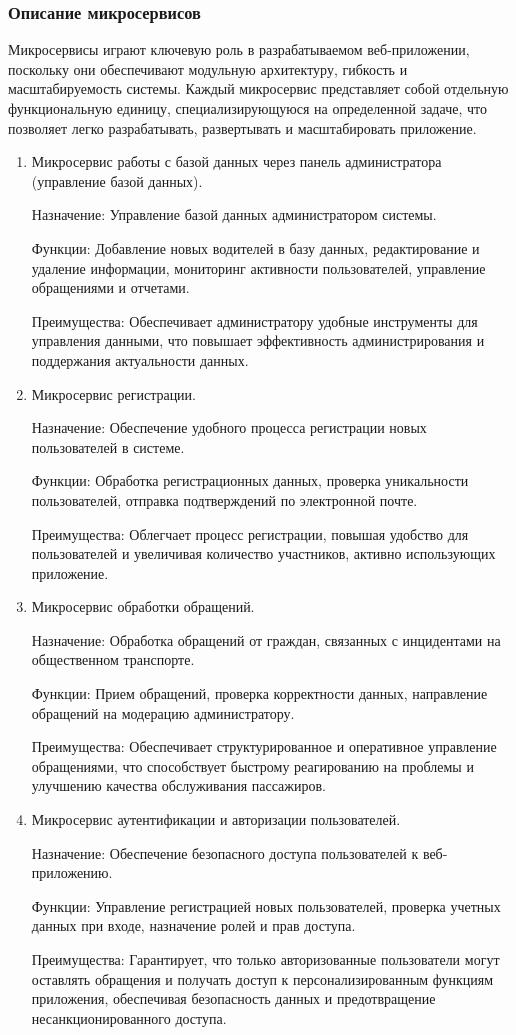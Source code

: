 \subsubsection{Описание микросервисов}
Микросервисы играют ключевую роль в разрабатываемом веб-приложении, поскольку они обеспечивают модульную архитектуру, гибкость и масштабируемость системы. Каждый микросервис представляет собой отдельную функциональную единицу, специализирующуюся на определенной задаче, что позволяет легко разрабатывать, развертывать и масштабировать приложение.
\begin{enumerate}
	
	\item Микросервис работы с базой данных через панель администратора (управление базой данных).
	
	Назначение: Управление базой данных администратором системы.
	
	Функции: Добавление новых водителей в базу данных, редактирование и удаление информации, мониторинг активности пользователей, управление обращениями и отчетами.
	
	Преимущества: Обеспечивает администратору удобные инструменты для управления данными, что повышает эффективность администрирования и поддержания актуальности данных.
	
	\item Микросервис регистрации.
	
	Назначение: Обеспечение удобного процесса регистрации новых пользователей в системе.
	
	Функции: Обработка регистрационных данных, проверка уникальности пользователей, отправка подтверждений по электронной почте.
	
	Преимущества: Облегчает процесс регистрации, повышая удобство для пользователей и увеличивая количество участников, активно использующих приложение.
	
		\item Микросервис обработки обращений.
	
	Назначение: Обработка обращений от граждан, связанных с инцидентами на общественном транспорте.
	
	Функции: Прием обращений, проверка корректности данных, направление обращений на модерацию администратору.
	
	Преимущества: Обеспечивает структурированное и оперативное управление обращениями, что способствует быстрому реагированию на проблемы и улучшению качества обслуживания пассажиров.
	
	\item Микросервис аутентификации и авторизации пользователей.
	
	Назначение: Обеспечение безопасного доступа пользователей к веб-приложению.
	
	Функции: Управление регистрацией новых пользователей, проверка учетных данных при входе, назначение ролей и прав доступа.
	
	Преимущества: Гарантирует, что только авторизованные пользователи могут оставлять обращения и получать доступ к персонализированным функциям приложения, обеспечивая безопасность данных и предотвращение несанкционированного доступа.
\end{enumerate}

